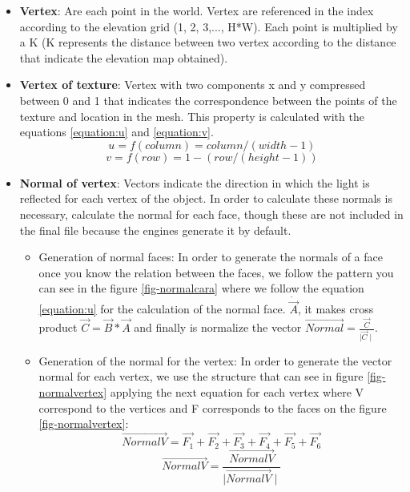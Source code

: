 \documentclass[10pt,a4paper,twocolumn,twoside]{article}
\begin{document}
\begin{itemize}
  \item \textbf{Vertex}: Are each point in the world. Vertex are referenced in the index according to the elevation grid (1, 2, 3,..., H*W). Each point is multiplied by a K (K represents the distance between two vertex according to the distance that indicate the elevation map obtained).

  \item {
    \textbf{Vertex of texture}: Vertex with two components x and y compressed between 0 and 1 that indicates the correspondence between the points of the texture and location in the mesh. This property is calculated with the equations \ref{equation:u} and \ref{equation:v}.
    \begin{equation}
    \label{equation:u}
    u = f(column) = column / (width - 1)
    \end{equation}
    \begin{equation}
    \label{equation:v}
    v = f(row) = 1 - (row / (height - 1))
    \end{equation}
  }

  \item \textbf{Normal of vertex}: Vectors indicate the direction in which the light is reflected for each vertex of the object. In order to calculate these normals is necessary, calculate the normal for each face, though these are not included in the final file because the engines generate it by default.

  \begin{itemize}
    \item {
      Generation of normal faces: In order to generate the normals of a face once you know the relation between the faces, we follow the pattern you can see in the figure \ref{fig-normalcara} where we follow the equation \ref{equation:u} for the calculation of the normal face. $\dot{\vec{A}}$, it makes cross product $\vec{C} = \vec{B}*\vec{A}$ and finally is normalize the vector $\vec{Normal} = \frac{\vec{C}}{\mid\vec{C}\mid}$.
    }

    \item {
    Generation of the normal for the vertex: In order to generate the vector normal for each vertex, we use the structure that can see in figure \ref{fig-normalvertex} applying the next equation for each vertex where V correspond to the vertices and F corresponds to the faces on the figure \ref{fig-normalvertex}:
      \begin{equation}
      \vec{NormalV} = \vec{F_1} + \vec{F_2} + \vec{F_3} + \vec{F_4} + \vec{F_5} + \vec{F_6}
      \end{equation}
      \begin{equation}
      \vec{NormalV} = \frac{\vec{NormalV}}{\mid\vec{NormalV}\mid}
      \end{equation}
    }
  \end{itemize}


\end{itemize}
\end{document}
